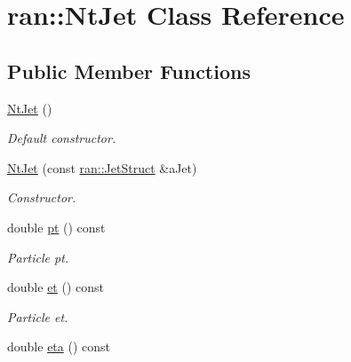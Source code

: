 \hypertarget{classran_1_1NtJet}{\section{ran\-:\-:Nt\-Jet Class Reference}
\label{classran_1_1NtJet}
}
\subsection*{Public Member Functions}
\begin{DoxyCompactItemize}
\item 
\hypertarget{classran_1_1NtJet_a40c6162763747a9353ba0cc36d4f4713}{\hyperlink{classran_1_1NtJet_a40c6162763747a9353ba0cc36d4f4713}{Nt\-Jet} ()}\label{classran_1_1NtJet_a40c6162763747a9353ba0cc36d4f4713}

\begin{DoxyCompactList}\small\item\em Default constructor. \end{DoxyCompactList}\item 
\hypertarget{classran_1_1NtJet_af447af0df9b93fbaf86b306034cc9ea0}{\hyperlink{classran_1_1NtJet_af447af0df9b93fbaf86b306034cc9ea0}{Nt\-Jet} (const \hyperlink{structran_1_1JetStruct}{ran\-::\-Jet\-Struct} \&a\-Jet)}\label{classran_1_1NtJet_af447af0df9b93fbaf86b306034cc9ea0}

\begin{DoxyCompactList}\small\item\em Constructor. \end{DoxyCompactList}\item 
\hypertarget{classran_1_1NtJet_a21823898e1e0afd81c377a065025c3b3}{double \hyperlink{classran_1_1NtJet_a21823898e1e0afd81c377a065025c3b3}{pt} () const }\label{classran_1_1NtJet_a21823898e1e0afd81c377a065025c3b3}

\begin{DoxyCompactList}\small\item\em Particle pt. \end{DoxyCompactList}\item 
\hypertarget{classran_1_1NtJet_ac934581307c87c5195272ad4e849d29f}{double \hyperlink{classran_1_1NtJet_ac934581307c87c5195272ad4e849d29f}{et} () const }\label{classran_1_1NtJet_ac934581307c87c5195272ad4e849d29f}

\begin{DoxyCompactList}\small\item\em Particle et. \end{DoxyCompactList}\item 
\hypertarget{classran_1_1NtJet_ac4fef92d0097c092069b5a82daa2c3ae}{double \hyperlink{classran_1_1NtJet_ac4fef92d0097c092069b5a82daa2c3ae}{eta} () const }\label{classran_1_1NtJet_ac4fef92d0097c092069b5a82daa2c3ae}


\end{DoxyCompactItemize}
